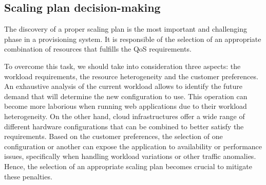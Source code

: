 \subsection{Scaling plan decision-making}

The discovery of a proper scaling plan is the most important and challenging phase in a provisioning system. It is responsible of the selection of an appropriate combination of resources that fulfills the QoS requirements.



To overcome this task, we should take into consideration three aspects: the workload requirements, the resource heterogeneity and the customer preferences. An exhaustive analysis of the current workload allows to identify the future demand that will determine the new configuration to use. This operation can become more laborious when running web applications due to their workload heterogeneity. On the other hand, cloud infrastructures offer a wide range of different hardware configurations that can be combined to better satisfy the requirements. Based on the customer preferences, the selection of one configuration or another can expose the application to availability or performance issues, specifically when handling workload variations or other traffic anomalies. Hence, the selection of an appropriate scaling plan becomes crucial to mitigate these penalties. 





